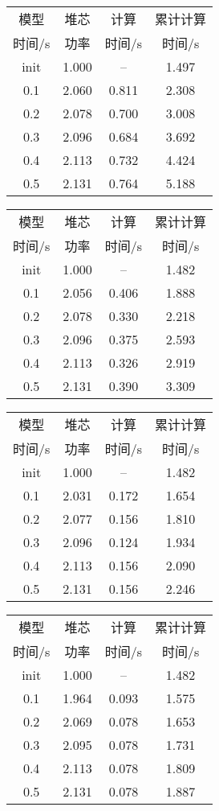 \begin{table}
{
\small
\begin{tabular}{cccc}
\toprule
模型 & 堆芯 & 计算 & 累计计算\\
时间/s & 功率 & 时间/s & 时间/s\\
\midrule
init & 1.000 & -- & 1.497\\
0.1 & 2.060 & 0.811 & 2.308\\
0.2 & 2.078 & 0.700 & 3.008\\
0.3 & 2.096 & 0.684 & 3.692\\
0.4 & 2.113 & 0.732 & 4.424\\
0.5 & 2.131 & 0.764 & 5.188\\
\bottomrule
\end{tabular}
}
{
\small
\begin{tabular}{cccc}
\toprule
模型 & 堆芯 & 计算 & 累计计算\\
时间/s & 功率 & 时间/s & 时间/s\\
\midrule
init & 1.000 & -- & 1.482\\
0.1 & 2.056 & 0.406 & 1.888\\
0.2 & 2.078 & 0.330 & 2.218\\
0.3 & 2.096 & 0.375 & 2.593\\
0.4 & 2.113 & 0.326 & 2.919\\
0.5 & 2.131 & 0.390 & 3.309\\
\bottomrule
\end{tabular}
}
{
\small
\begin{tabular}{cccc}
\toprule
模型 & 堆芯 & 计算 & 累计计算\\
时间/s & 功率 & 时间/s & 时间/s\\
\midrule
init & 1.000 & -- & 1.482\\
0.1 & 2.031 & 0.172 & 1.654\\
0.2 & 2.077 & 0.156 & 1.810\\
0.3 & 2.096 & 0.124 & 1.934\\
0.4 & 2.113 & 0.156 & 2.090\\
0.5 & 2.131 & 0.156 & 2.246\\
\bottomrule
\end{tabular}
}
{
\small
\begin{tabular}{cccc}
\toprule
模型 & 堆芯 & 计算 & 累计计算\\
时间/s & 功率 & 时间/s & 时间/s\\
\midrule
init & 1.000 & -- & 1.482\\
0.1 & 1.964 & 0.093 & 1.575\\
0.2 & 2.069 & 0.078 & 1.653\\
0.3 & 2.095 & 0.078 & 1.731\\
0.4 & 2.113 & 0.078 & 1.809\\
0.5 & 2.131 & 0.078 & 1.887\\
\bottomrule
\end{tabular}
}
\end{table}

